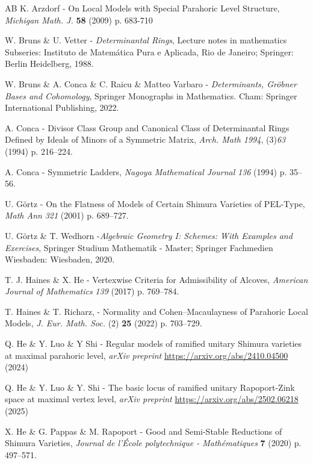 \documentclass[pdflatex,sn-mathphys-num]{sn-jnl}%
\theoremstyle{thmstyleone}%
\theoremstyle{thmstyletwo}%
\numberwithin{equation}{subsection}
\theoremstyle{thmstylethree}%
\begin{document}
\begin{thebibliography}{AB}
K. Arzdorf - On Local Models with Special Parahoric Level Structure,
\emph{Michigan Math. J.} \textbf{58} (2009) p. 683-710
			
W. Bruns \& U. Vetter - \emph{Determinantal Rings},
Lecture notes in mathematics Subseries: Instituto de Matemática Pura e Aplicada, Rio de Janeiro; Springer: Berlin Heidelberg, 1988.

W. Bruns \&  A. Conca \& C. Raicu \& Matteo Varbaro - \emph{Determinants, Gr\"obner Bases and Cohomology}, Springer Monographs in Mathematics. Cham: Springer International Publishing, 2022. 
			
A. Conca - Divisor Class Group and Canonical Class of Determinantal Rings Defined by Ideals of Minors of a Symmetric Matrix,
\emph{Arch. Math 1994}, (3)\emph{63} (1994) p. 216–224. 
			
A. Conca - Symmetric Ladders,
\emph{Nagoya Mathematical Journal} \emph{136} (1994) p. 35–56.
			
U. G\"ortz - On the Flatness of Models of Certain Shimura Varieties of PEL-Type, \emph{Math Ann} \emph{321} (2001) p. 689–727. 
			
U. G\"ortz \& T. Wedhorn -\emph{Algebraic Geometry I: Schemes: With Examples and Exercises},
Springer Studium Mathematik - Master; Springer Fachmedien Wiesbaden: Wiesbaden, 2020. 
			
T. J. Haines \& X. He - Vertexwise Criteria for Admissibility of Alcoves,
\emph{American Journal of Mathematics} \emph{139} (2017) p. 769–784.

T. Haines \& T. Richarz, - Normality and Cohen–Macaulayness of Parahoric Local Models,
\emph{J. Eur. Math. Soc.} (2) \textbf{25} (2022) p. 703–729.

Q. He \& Y. Luo \& Y Shi - Regular models of ramified unitary Shimura varieties at maximal parahoric level,
\emph{arXiv preprint} \url{https://arxiv.org/abs/2410.04500} (2024)

Q. He \& Y. Luo \& Y. Shi - The basic locus of ramified unitary Rapoport-Zink space at maximal vertex level,
\emph{arXiv preprint} \url{https://arxiv.org/abs/2502.06218} (2025)

   
X. He \& G. Pappas \& M. Rapoport - Good and Semi-Stable Reductions of Shimura Varieties, 
\emph{Journal de l’École polytechnique - Mathématiques} \textbf{7} (2020) p. 497–571.




\end{thebibliography}
\end{document}
